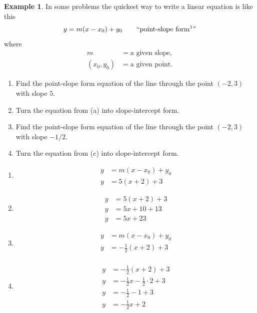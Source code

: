 \documentclass[oneside]{book}
\theoremstyle{definition}
\newtheorem{example}{Example}
\theoremstyle{solution}
\newtheorem*{solution}{Solution}
\newcommand{\handoutfill}{}
\newcommand{\handoutitemsep}{}
\newenvironment{solution}{\vspace{2in}\comment}{\endcomment}
\newcommand{\handoutfill}{\vfill}
\newcommand{\handoutitemsep}{\itemsep=\fill}
\begin{document}
\begin{example}
In some problems the quickest way to write a linear equation is like
this
$$
y = m(x-x_0) + y_0 \qquad \text{``point-slope
  form\footnotemark''}
$$
where
\begin{align*}
m & = \text{a given slope},\\
(x_0,y_0) & = \text{a given point}.
\end{align*}

\begin{enumerate}
\handoutitemsep
\item Find the point-slope form equation of the line through the point
  $(-2,3)$ with slope $5$.

\item Turn the equation from (a) into slope-intercept form.

\item 
Find the point-slope form equation of the line through the point
  $(-2,3)$ with slope $-1/2$.

\item Turn the equation from (c) into slope-intercept form.
\handoutfill
\end{enumerate}
\end{example}

\begin{solution}
\begin{enumerate}
\item \begin{align*}
 y & = m(x-x_0) + y_0\\
 y & = 5(x+2)+3
\end{align*}

\item 
\begin{align*}
 y & = 5(x+2)+3\\
 y & = 5x+10 + 13\\
 y & = 5x + 23
\end{align*}

\item 
\begin{align*}
y & = m(x-x_0) + y_0\\
y & = -\frac{1}{2}(x+2)+3\\
\end{align*}

\item 
\begin{align*}
y & = -\frac{1}{2}(x+2)+3\\
y & = -\frac{1}{2}x -\frac{1}{2}\cdot 2 +3\\
y & = -\frac{1}{2} - 1 + 3\\
y & = -\frac{1}{2 }x + 2
\end{align*}
\end{enumerate}
\end{solution}
\end{document}
